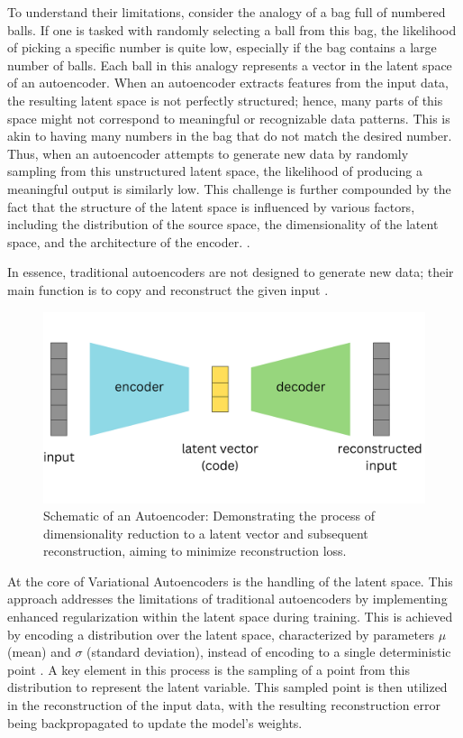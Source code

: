 To understand their limitations, consider the analogy of a bag full of numbered balls. If one is tasked with randomly selecting a ball from this bag, the likelihood of picking a specific number is quite low, especially if the bag contains a large number of balls. Each ball in this analogy represents a vector in the latent space of an autoencoder. When an autoencoder extracts features from the input data, the resulting latent space is not perfectly structured; hence, many parts of this space might not correspond to meaningful or recognizable data patterns. This is akin to having many numbers in the bag that do not match the desired number. Thus, when an autoencoder attempts to generate new data by randomly sampling from this unstructured latent space, the likelihood of producing a meaningful output is similarly low. This challenge is further compounded by the fact that the structure of the latent space is influenced by various factors, including the distribution of the source space, the dimensionality of the latent space, and the architecture of the encoder.
\citep{michelucci2022introduction}.

In essence, traditional autoencoders are not designed to generate new data; their main function is to copy and reconstruct the given input \citep{GoodfellowDeepLearning}.

\begin{figure}[ht]
    \centering
      \hspace{.8cm}
      \includegraphics[width=.7\columnwidth]{figures/Autoencoder.png}
      \caption{Schematic of an Autoencoder: Demonstrating the process of dimensionality reduction to a latent vector and subsequent reconstruction, aiming to minimize reconstruction loss.}\label{fig:figureAE}
\end{figure}

At the core of Variational Autoencoders is the handling of the latent space. This approach addresses the limitations of traditional autoencoders by implementing enhanced regularization within the latent space during training. This is achieved by encoding a distribution over the latent space, characterized by parameters \(\mu\) (mean) and \(\sigma\) (standard deviation), instead of encoding to a single deterministic point \citep{doerschVAE}. A key element in this process is the sampling of a point from this distribution to represent the latent variable. This sampled point is then utilized in the reconstruction of the input data, with the resulting reconstruction error being backpropagated to update the model's weights.

